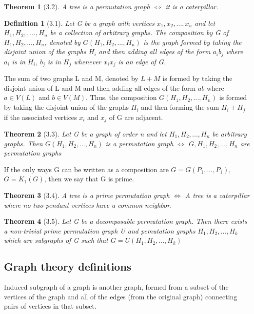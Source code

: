 \documentclass{article}
\newtheorem*{definition}{Definition}
\newtheorem*{theorem}{Theorem}
\begin{document}
\begin{theorem}[3.2]
    A tree is a permutation graph $\Leftrightarrow$ it is a caterpillar.
\end{theorem}

\begin{definition}[3.1]
    Let G be a graph with vertices $x_1, x_2, ..., x_n$ and let $H_1, H_2, ,..., H_n$ be a collection of arbitrary graphs. The composition by G of $H_1, H_2, ..., H_n$, denoted by $G(H_1, H_2, ..., H_n)$ is the graph formed by taking the disjoint union of the graphs $H_i$ and then adding all edges of the form $a_ib_j$ where $a_i$ is in $H_i$, $b_j$ is in $H_j$ whenever $x_ix_j$ is an edge of G.
\end{definition}

The sum of two graphs L and M, denoted by $L + M$ is formed by taking the disjoint union of L and M and then adding all edges of the form $ab$ where $a \in V(L)$ and $b \in V(M)$. Thus, the composition $G(H_1, H_2, ..., H_n)$ is formed by taking the disjoint union of the graphs $H_i$ and then forming the sum $H_i + H_j$ if the associated vertices $x_i$ and $x_j$ of G are adjacent.

\begin{theorem}[3.3]
    Let G be a graph of order n and let $H_1, H_2, ..., H_n$ be arbitrary graphs. Then $G(H_1, H_2, ..., H_n)$ is a permutation graph $\Leftrightarrow$ $G, H_1, H_2, ..., H_n$ are permutation graphs
\end{theorem}

If the only ways G can be written as a composition are $G = G(P_1,...,P_1)$, $G = K_1(G)$, then we say that G is prime.

\begin{theorem}[3.4]
    A tree is a prime permutation graph $\Leftrightarrow$ A tree is a caterpillar where no two pendant vertices have a common neighbor.
\end{theorem}

\begin{theorem}[3.5]
    Let G be a decomposable permutation graph. Then there exists a non-trivial prime permutation graph U and pemutation graphs $H_1, H_2, ..., H_k$ which are subgraphs of G such that $G = U(H_1, H_2, ..., H_k)$
\end{theorem}

\subsection{ Graph theory definitions}
Induced subgraph of a graph is another graph, formed from a subset of the vertices of the graph and all of the edges (from the original graph) connecting pairs of vertices in that subset.
\end{document}
